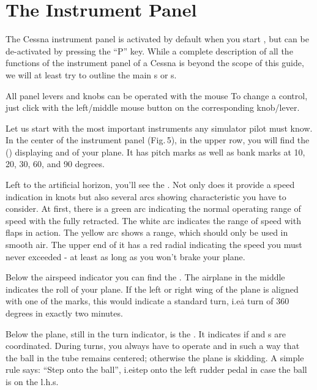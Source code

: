 \section{The Instrument Panel}

The Cessna instrument panel is activated by default when you start \FlightGear{}, but can be
de-activated by pressing the ``P'' key.  While a complete description of all the
functions of the instrument panel of a Cessna is beyond the scope of this guide, we will
at least try to outline the main s or s.

All panel levers and knobs can be operated with the mouse To change a
control, just click with the left/middle mouse button on the
corresponding knob/lever.

Let us start with the most important instruments any simulator pilot must know. In the
center of the instrument panel (Fig.\,5), in the upper row, you will find the
 () displaying  and
 of your plane. It has pitch marks as well as bank marks at 10, 20, 30, 60,
and 90 degrees.

Left to the artificial horizon, you'll see the . Not only does
it provide a speed indication in knots but also several arcs showing characteristic
 you have to consider. At first, there is a green arc indicating
the normal operating range of speed with the  fully retracted. The white arc
indicates the range of speed with flaps in action. The yellow arc shows a range, which
should only be used in smooth air. The upper end of it has a red radial indicating the
speed you must never exceeded - at least as long as you won't brake your plane.

Below the airspeed indicator you can find the . The airplane in the
middle indicates the roll of your plane. If the left or right wing of the plane is
aligned with one of the marks, this would indicate a standard turn, i.e\. a turn of 360
degrees in exactly two minutes.

Below the plane, still in the turn indicator, is the . It indicates
if  and s are coordinated. During turns, you always have to
operate  and  in such a way that the ball in the tube
remains centered; otherwise the plane is skidding. A simple rule says:
``Step onto the ball'', i.e\. step onto the left rudder pedal in case
the ball is on the l.h.s.
\medskip

